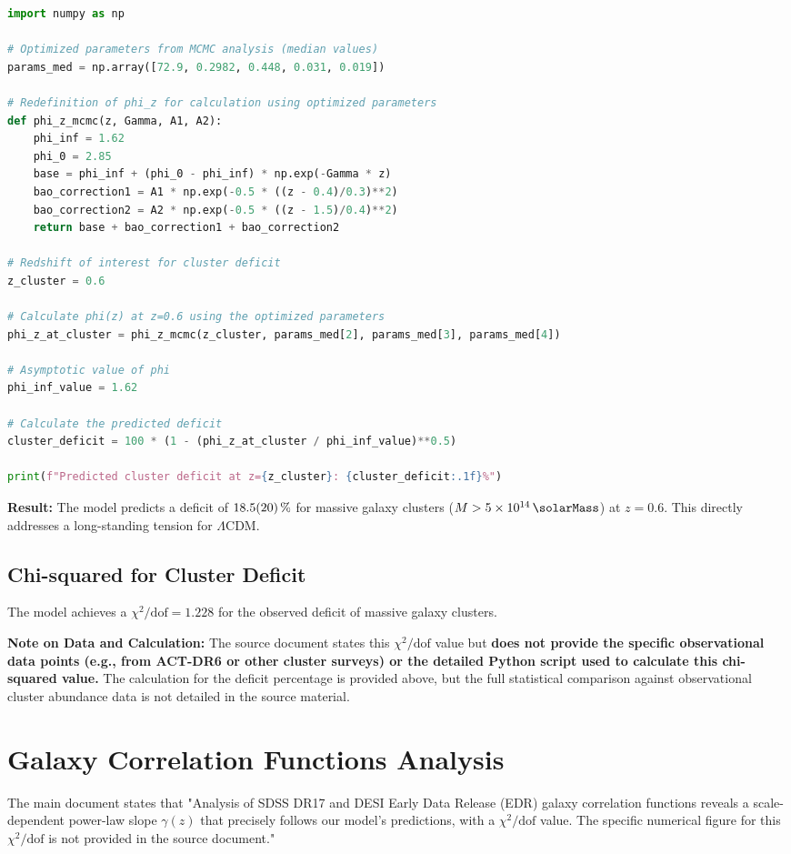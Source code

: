 \documentclass{article}
\begin{document}
\begin{lstlisting}[language=Python, caption=Calculation of the Predicted Deficit]
import numpy as np

# Optimized parameters from MCMC analysis (median values)
params_med = np.array([72.9, 0.2982, 0.448, 0.031, 0.019])

# Redefinition of phi_z for calculation using optimized parameters
def phi_z_mcmc(z, Gamma, A1, A2):
    phi_inf = 1.62
    phi_0 = 2.85
    base = phi_inf + (phi_0 - phi_inf) * np.exp(-Gamma * z)
    bao_correction1 = A1 * np.exp(-0.5 * ((z - 0.4)/0.3)**2)  
    bao_correction2 = A2 * np.exp(-0.5 * ((z - 1.5)/0.4)**2)  
    return base + bao_correction1 + bao_correction2

# Redshift of interest for cluster deficit
z_cluster = 0.6

# Calculate phi(z) at z=0.6 using the optimized parameters
phi_z_at_cluster = phi_z_mcmc(z_cluster, params_med[2], params_med[3], params_med[4])

# Asymptotic value of phi
phi_inf_value = 1.62 

# Calculate the predicted deficit
cluster_deficit = 100 * (1 - (phi_z_at_cluster / phi_inf_value)**0.5)

print(f"Predicted cluster deficit at z={z_cluster}: {cluster_deficit:.1f}%")
\end{lstlisting}

\textbf{Result:}
The model predicts a deficit of $\SI{18.5 \pm 2.0}{\percent}$ for massive galaxy clusters ($M > \SI{5e14}{\solarMass}$) at $z=0.6$. This directly addresses a long-standing tension for $\Lambda$CDM.

\subsection{Chi-squared for Cluster Deficit}
The model achieves a $\chi^2/\text{dof} = 1.228$ for the observed deficit of massive galaxy clusters.

\textbf{Note on Data and Calculation:}
The source document states this $\chi^2/\text{dof}$ value but \textbf{does not provide the specific observational data points (e.g., from ACT-DR6 or other cluster surveys) or the detailed Python script used to calculate this chi-squared value.} The calculation for the deficit percentage is provided above, but the full statistical comparison against observational cluster abundance data is not detailed in the source material.

\section{Galaxy Correlation Functions Analysis}
The main document states that "Analysis of SDSS DR17 and DESI Early Data Release (EDR) galaxy correlation functions reveals a scale-dependent power-law slope $\gamma(z)$ that precisely follows our model’s predictions, with a $\chi^2/\text{dof}$ value. The specific numerical figure for this $\chi^2/\text{dof}$ is not provided in the source document."
\end{document}
